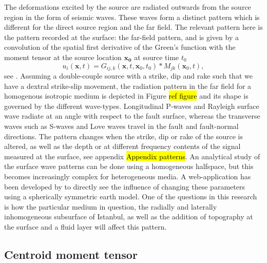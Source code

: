 \documentclass[../Text/00main.tex]{subfiles}
\begin{document}
The deformations excited by the source are radiated outwards from the source region in the form of seismic waves. These waves form a distinct pattern which is different for the direct source region and the far field. The relevant pattern here is the pattern recorded at the surface: the far-field pattern, and is given by a convolution of the spatial first derivative of the Green's function with the moment tensor at the source location $\mathbf{x_0}$ at source time $t_0$
\begin{equation}
u_{i}(\mathbf{x}, t)=G_{i j, k}\left(\mathbf{x}, t, \mathbf{x}_{0}, t_{0}\right) * M_{j k}\left(\mathbf{x}_{0}, t\right), 
\end{equation}
see \citep{aki_quantitative_2002}. Assuming a double-couple source with a strike, dip and rake such that we have a dextral strike-slip movement, the radiation pattern in the far field for a homogenous isotropic medium is depicted in Figure \hl{ref figure} and its shape is governed by the different wave-types. Longitudinal P-waves and Rayleigh surface wave radiate at an angle with respect to the fault surface, whereas the transverse waves such as S-waves and Love waves travel in the fault and fault-normal directions. The pattern changes when the strike, dip or rake of the source is altered, as well as the depth or at different frequency contents of the signal measured at the surface, see appendix \hl{Appendix patterns}. An analytical study of the surface wave patterns can be done using a homogeneous halfspace, but this becomes increasingly complex for heterogeneous media. A web-application has been developed by  \citep{rosler2020using} to directly see the influence of changing these parameters using a spherically symmetric earth model. One of the questions in this research is how the particular medium in question, the radially and laterally inhomogeneous subsurface of Istanbul, as well as the addition of topography at the surface and a fluid layer will affect this pattern. 


\subsection{Centroid moment tensor}
\end{document}
